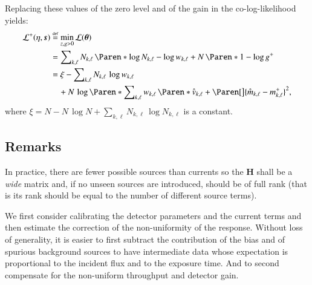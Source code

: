 \documentclass{aa}
\newcommand{\oops}[1]{\textcolor[named]{OrangeRed1}{#1}}
\newcommand*{\bydef}{\stackrel{{\scriptscriptstyle \text{def}}}{=}}
\newcommand*{\empirical}[1]{\mathring{#1}}
\newcommand*{\V}[1]{\boldsymbol{#1}}   %
\newcommand*{\M}[1]{\mathbf{#1}}       %
\newcommand*{\MC}[1]{\mathcal{#1}}
\newcommand*{\lkl}{\MC{L}}
\newcommand*{\lklplus}{\MC{L}^+}
\begin{document}
Replacing these values of the zero level and of the gain in the
co-log-likelihood yields:
\begin{align}
  \label{eq:marginal-cologlikelihood}
  \lklplus(\eta, \V s)
  &\bydef \min_{z,g > 0}\lkl(\V\theta) \notag\\
  &= \sum\nolimits_{k,\ell} N_{k,\ell}\,\Paren*{\log N_{k,\ell} - \log w_{k,\ell}}
     + N\,\Paren*{1 - \log g^+} \notag \\
  &= \xi - \sum\nolimits_{k,\ell} N_{k,\ell}\,\log w_{k,\ell} \notag \\
  &\quad + N\,\log\Paren*{\sum\nolimits_{k,\ell} w_{k,\ell}\,
    \Paren*{\empirical{v}_{k,\ell} +
    \Paren[\big]{\empirical{m}_{k,\ell} - m^+_{k,\ell}}^2}},
\end{align}
where $\xi = N - N\,\log N + \sum\nolimits_{k,\ell} N_{k,\ell}\,\log N_{k,\ell}$
is a constant.


\subsection{Remarks}



\oops{In practice, there are fewer possible sources than currents so the $\M H$
  shall be a \emph{wide} matrix and, if no unseen sources are introduced,
  should be of full rank (that is its rank should be equal to the number of
  different source terms).}

\oops{We first consider calibrating the detector parameters and the current
terms and then estimate the correction of the non-uniformity of the response.
Without loss of generality, it is easier to first subtract the contribution of
the bias and of spurious background sources to have intermediate data whose
expectation is proportional to the incident flux and to the exposure time. And
to second compensate for the non-uniform throughput and detector gain.}
\end{document}
